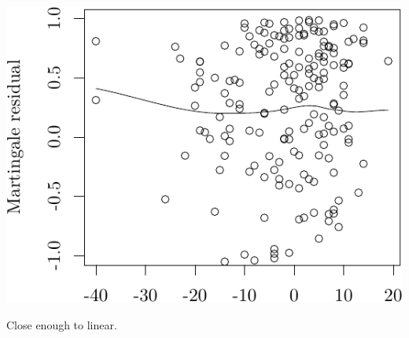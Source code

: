 \documentclass{article}\usepackage[]{graphicx}\usepackage[]{color}
\makeatletter
\def\maxwidth{ %
  \ifdim\Gin@nat@width>\linewidth
    \linewidth
  \else
    \Gin@nat@width
  \fi
}
\newenvironment{knitrout}{}{} %
\makeatother
\begin{document}
\begin{knitrout}
{\centering \includegraphics[width=\maxwidth]{figure/05-eda-func-form-age-2} 

}



\end{knitrout}
Close enough to linear.
\end{document}

